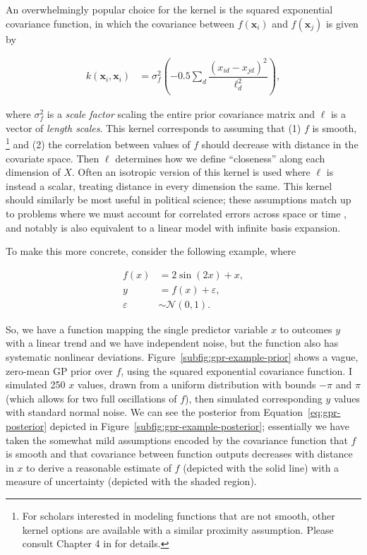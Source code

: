 \documentclass{draft}
\begin{document}
An overwhelmingly popular choice for the kernel is the squared exponential covariance function,
in which the covariance between \( f \left( \mathbf{x}_i \right) \) and \( f \left( \mathbf{x}_j \right) \)
is given by

\vspace*{-\baselineskip}
\begin{align}
    k \left( \mathbf{x}_i, \mathbf{x}_i \right)
    & =
    \sigma_f^2 \left( -0.5 \sum_d \dfrac{\left( x_{id} - x_{jd} \right)^2}{\ell_d^2} \right),
\end{align}

\noindent
where \( \sigma_f^2 \) is a \emph{scale factor} scaling the entire prior covariance matrix
and \( \boldsymbol\ell \) is a vector of \emph{length scales}.
This kernel corresponds to assuming that (1) \( f \) is smooth,%
\footnote{
    For scholars interested in modeling functions that are not smooth,
    other kernel options are available with a similar proximity assumption.
    Please consult Chapter 4 in \citet{RasmussenWilliams2006Gaussian} for details.
}
and (2) the correlation between values of \( f \) should decrease with distance in the covariate space.
Then \( \boldsymbol\ell \) determines how we define ``closeness'' along each dimension of \( X \).
Often an isotropic version of this kernel is used where \( \ell \) is instead a scalar,
treating distance in every dimension the same.
This kernel should similarly be most useful in political science;
these assumptions match up to problems where we must
account for correlated errors across space or time \citep{Carlson2020Modeling, Gill2020Measuring},
and notably is also equivalent to a linear model with infinite basis expansion.

To make this more concrete, consider the following example, where

\vspace*{-\baselineskip}
\begin{align}
    f \left( x \right) & = 2 \sin \left( 2x \right) + x, \\
    y & = f \left( x \right) + \varepsilon, \\
    \varepsilon & \sim \mathcal{N} \left( 0, 1 \right).
\end{align}

\noindent
So, we have a function mapping the single predictor variable \( x \) to outcomes \( y \) with a linear trend
and we have independent noise, but the function also has systematic nonlinear deviations.
Figure~\ref{subfig:gpr-example-prior} shows a vague, zero-mean GP prior over \( f \), using the squared exponential covariance function.
I simulated 250 \( x \) values, drawn from a uniform distribution with bounds \( -\pi \) and \( \pi \)
(which allows for two full oscillations of \( f \)),
then simulated corresponding \( y \) values with standard normal noise.
We can see the posterior from Equation~\ref{eq:gpr-posterior} depicted in Figure~\ref{subfig:gpr-example-posterior};
essentially we have taken the somewhat mild assumptions encoded by the covariance function
that \( f \) is smooth and that covariance between function outputs decreases with distance in \( x \)
to derive a reasonable estimate of \( f \) (depicted with the solid line)
with a measure of uncertainty (depicted with the shaded region).
\end{document}
